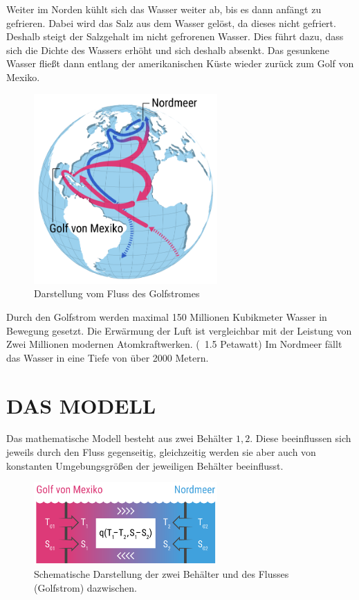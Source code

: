 \documentclass[a4paper,twoside]{article}
\begin{document}
	Weiter im Norden kühlt sich das Wasser weiter ab, bis es dann anfängt zu gefrieren. Dabei wird das Salz aus dem Wasser gelöst, da dieses nicht gefriert. Deshalb steigt der Salzgehalt im nicht gefrorenen Wasser. Dies führt dazu, dass sich die Dichte des Wassers erhöht und sich deshalb absenkt. Das gesunkene Wasser fließt dann entlang der amerikanischen Küste wieder zurück zum Golf von Mexiko.
	\begin{figure}[!h]
  		\centering
 		\includegraphics[width=7cm]{../Diagramme/golfstrom_fluss.png}
  		\caption{Darstellung vom Fluss des Golfstromes}
  		\label{fig:flussGolfstrom}
	\end{figure}

Durch den Golfstrom werden maximal 150 Millionen Kubikmeter Wasser in Bewegung gesetzt. 
Die Erwärmung der Luft ist vergleichbar mit der Leistung von Zwei Millionen modernen Atomkraftwerken. (~1.5 Petawatt)
Im Nordmeer fällt das Wasser in eine Tiefe von über 2000 Metern.
 
	

	
	\section{\uppercase{Das Modell}}\label{sec:Modell}
	
	
	\noindent Das mathematische Modell besteht aus zwei Behälter \(1,2\). Diese beeinflussen sich jeweils durch den Fluss gegenseitig, gleichzeitig werden sie aber auch von konstanten Umgebungsgrößen der jeweiligen Behälter beeinflusst.
	
	\begin{figure}[!h]
  		\centering
 		\includegraphics[width=7cm]{../Diagramme/skizze_modell.png}
  		\caption{Schematische Darstellung der zwei Behälter und des Flusses (Golfstrom) dazwischen.}
  		\label{fig:modell}
	\end{figure}
	
\end{document}

